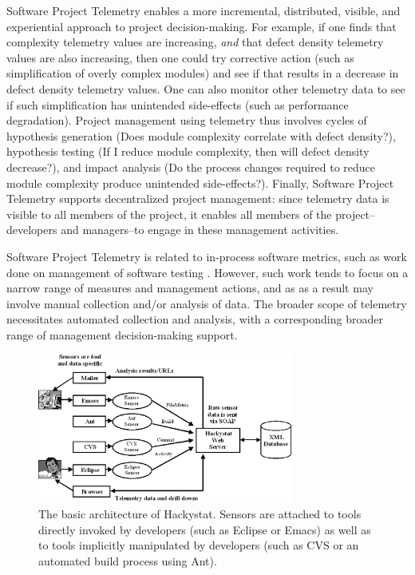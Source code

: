 \documentclass[11pt,twocolumn]{article}
\begin{document}
Software Project Telemetry enables a more incremental, distributed,
visible, and experiential approach to project decision-making. For example,
if one finds that complexity telemetry values are increasing, {\em and}
that defect density telemetry values are also increasing, then one could
try corrective action (such as simplification of overly complex modules)
and see if that results in a decrease in defect density telemetry
values. One can also monitor other telemetry data to see if such
simplification has unintended side-effects (such as performance
degradation).  Project management using telemetry thus involves cycles of
hypothesis generation (Does module complexity correlate with defect
density?), hypothesis testing (If I reduce module complexity, then will
defect density decrease?), and impact analysis (Do the process changes
required to reduce module complexity produce unintended side-effects?).
Finally, Software Project Telemetry supports decentralized project
management: since telemetry data is visible to all members of the project,
it enables all members of the project--developers and managers--to engage
in these management activities.

Software Project Telemetry is related to in-process software metrics, such
as work done on management of software testing \cite{Kan01}. However,
such work tends to focus on a narrow range of measures and management
actions, and as as a result may involve manual collection and/or analysis of data.  The
broader scope of telemetry necessitates automated collection and analysis,
with a corresponding broader range of management decision-making support.

\begin{figure}[ht]
  \centering
  \includegraphics[width=0.75\textwidth]{architecture.eps}
  \caption{The basic architecture of Hackystat. Sensors are attached to
  tools directly invoked by developers (such as Eclipse or Emacs) as
  well as to tools implicitly manipulated by developers (such as CVS or 
  an automated build process using Ant).}
  \label{fig:architecture}
\end{figure}
\end{document}
